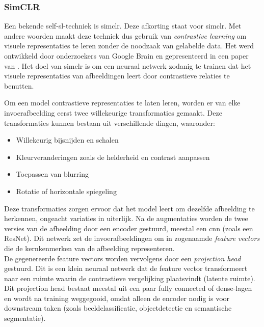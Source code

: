 \lipsum[1]

\subsubsection{SimCLR}

Een bekende \gls{self-sl}-techniek is \acrshort{simclr}. Deze afkorting staat voor \acrlong{simclr}. Met andere woorden maakt deze techniek dus gebruik van \emph{contrastive learning} om visuele representaties te leren zonder de noodzaak van gelabelde data. Het werd ontwikkeld door onderzoekers van Google Brain en gepresenteerd in een paper van \textcite{Chen_2020}. Het doel van \gls{simclr} is om een neuraal netwerk zodanig te trainen dat het visuele representaties van afbeeldingen leert door contrastieve relaties te benutten.

Om een model contrastieve representaties te laten leren, worden er van elke invoerafbeelding eerst twee willekeurige transformaties gemaakt. Deze transformaties kunnen bestaan uit verschillende dingen, waaronder:

\begin{itemize}
    \item Willekeurig bijsnijden en schalen
    \item Kleurveranderingen zoals de helderheid en contrast aanpassen
    \item Toepassen van blurring
    \item Rotatie of horizontale spiegeling
\end{itemize}

Deze transformaties zorgen ervoor dat het model leert om dezelfde afbeelding te herkennen, ongeacht variaties in uiterlijk. Na de augmentaties worden de twee versies van de afbeelding door een encoder gestuurd, meestal een \gls{cnn} (zoals een ResNet). Dit netwerk zet de invoerafbeeldingen om in zogenaamde \emph{feature vectors} die de kernkenmerken van de afbeelding representeren. \\

De gegenereerde feature vectors worden vervolgens door een \emph{projection head} gestuurd. Dit is een klein neuraal netwerk dat de feature vector transformeert naar een ruimte waarin de contrastieve vergelijking plaatsvindt (latente ruimte). Dit projection head bestaat meestal uit een paar  fully connected of dense-lagen en wordt na training weggegooid, omdat alleen de encoder nodig is voor downstream taken (zoals beeldclassificatie, objectdetectie en semantische segmentatie). \autocite{Gupta_2022} \\

